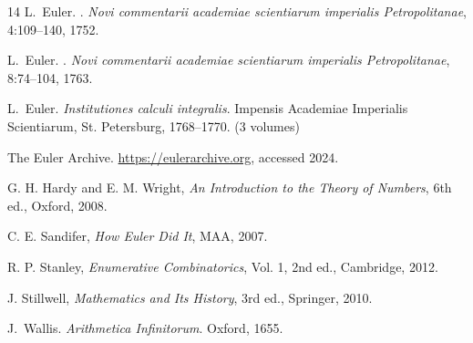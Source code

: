\documentclass[11pt,a4paper,twoside]{book}
\theoremstyle{eulerstyle}
\theoremstyle{definition}
\begin{document}
\begin{thebibliography}{14}
L.~Euler.
.
\newblock \emph{Novi commentarii academiae scientiarum imperialis Petropolitanae}, 4:109--140, 1752.

L.~Euler.
.
\newblock \emph{Novi commentarii academiae scientiarum imperialis Petropolitanae}, 8:74--104, 1763.

L.~Euler.
\newblock \emph{Institutiones calculi integralis}.
\newblock Impensis Academiae Imperialis Scientiarum, St. Petersburg, 1768--1770. (3 volumes)

The Euler Archive.
\newblock \url{https://eulerarchive.org}, accessed 2024.

G. H. Hardy and E. M. Wright, \textit{An Introduction to the Theory of Numbers}, 6th ed., Oxford, 2008.

C. E. Sandifer, \textit{How Euler Did It}, MAA, 2007.

R. P. Stanley, \textit{Enumerative Combinatorics}, Vol. 1, 2nd ed., Cambridge, 2012.

J. Stillwell, \textit{Mathematics and Its History}, 3rd ed., Springer, 2010.

J.~Wallis.
\newblock \emph{Arithmetica Infinitorum}.
\newblock Oxford, 1655.

\end{thebibliography}
\end{document}
